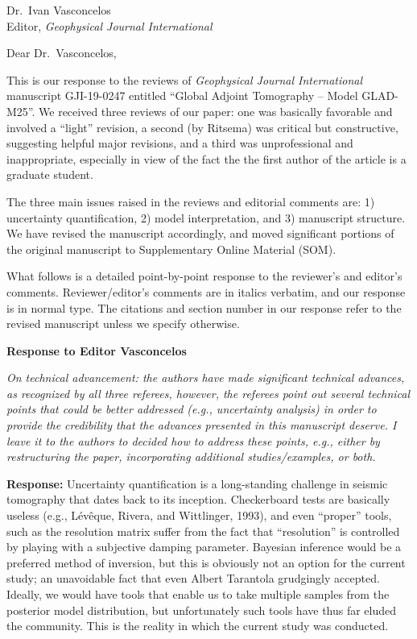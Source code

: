 \documentclass[11pt,a4paper]{letter}
\newcommand{\response}[1]{\textbf{Response:} #1}
\newcommand{\rev}[1]{{\it{#1}}}
\begin{document}
 

\begin{letter}{Dr.~Ivan Vasconcelos\\
Editor, \textit{Geophysical Journal International}} 

\opening{Dear Dr.~Vasconcelos,} 

This is our response to the reviews of \textit{Geophysical Journal International\/} manuscript GJI-19-0247 entitled ``Global Adjoint Tomography -- Model GLAD-M25''.
We received three reviews of our paper: one was basically favorable and involved a ``light'' revision, a second (by Ritsema) was critical but constructive, suggesting helpful major revisions, and a third was unprofessional and inappropriate, especially in view of the fact the the first author of the article is a graduate student.

The three main issues raised in the reviews and editorial comments are: 1) uncertainty quantification, 2) model interpretation, and 3) manuscript structure.
We have revised the manuscript accordingly,
and moved significant portions of the original manuscript to Supplementary Online Material (SOM).

What follows is a detailed point-by-point response to the reviewer's and editor's comments.
Reviewer/editor's comments are in italics verbatim, and our response is in normal type. The citations and section number in our response refer to the revised manuscript unless we specify otherwise.

{\textbf{\large Response to Editor Vasconcelos}}

\rev{On technical advancement: the authors have made significant technical advances, as recognized by all three referees, however, the referees point out several technical points that could be better addressed (e.g., uncertainty analysis) in order to provide the credibility that the advances presented in this manuscript deserve. I leave it to the authors to decided how to address these points, e.g., either by restructuring the paper, incorporating additional studies/examples, or both.
}

\response{Uncertainty quantification is a long-standing challenge in seismic tomography that dates back to its inception. Checkerboard tests are basically useless (e.g., L\'ev\^eque, Rivera, and Wittlinger, 1993), and even ``proper'' tools, such as the resolution matrix suffer from the fact that ``resolution'' is controlled by playing with a subjective damping parameter. Bayesian
 inference would be a preferred method of inversion, but this is obviously not an option for the current study; an unavoidable fact that even Albert Tarantola grudgingly accepted.
Ideally, we would have tools that enable us to take multiple samples from the posterior model distribution, but unfortunately such tools have thus far eluded the community.
This is the reality in which the current study was conducted.

}
\end{letter}
\end{document}
